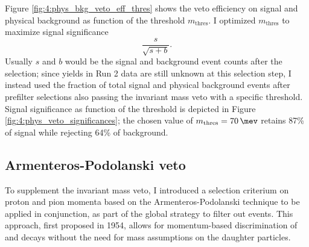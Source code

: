 Figure \ref{fig:4:phys_bkg_veto_eff_thres} shows the veto efficiency on \demonstratorshort signal and \physbkgshort physical background as function of the threshold $m_\text{thres}$.
I optimized $m_\text{thres}$ to maximize signal significance
\begin{equation}
\frac{s}{\sqrt{s+b}}.
\label{eq:4:signal_significance}
\end{equation}
Usually $s$ and $b$ would be the signal and background event counts after the selection;
since yields in Run 2 data are still unknown at this selection step, I instead used the fraction of total signal and physical background events after prefilter selections also passing the invariant mass veto with a specific threshold.
Signal significance as function of the threshold is depicted in Figure \ref{fig:4:phys_veto_significances};
the chosen value of $m_\text{thres} = \SI{70}{\mev}$ retains 87\% of signal while rejecting 64\% of background.

\subsection{Armenteros-Podolanski veto}
To supplement the invariant mass veto, I introduced a selection criterium on proton and pion momenta based on the Armenteros-Podolanski technique \cite{armenteros-podolanski} to be applied in conjunction, as part of the global strategy to filter out \physbkgshort events.
This approach, first proposed in 1954, allows for momentum-based discrimination of \lambdadecay and \kshortdecay decays without the need for mass assumptions on the daughter particles.

